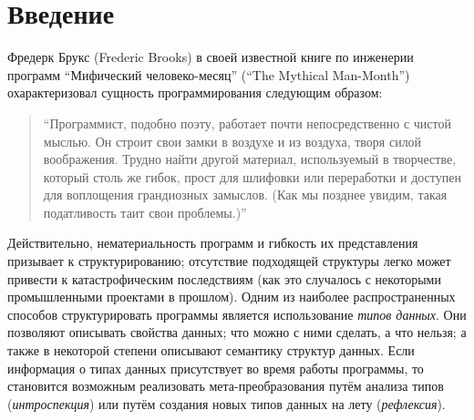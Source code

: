 \section{Введение}

Фредерк Брукс (Frederic Brooks) в своей известной книге по инженерии
программ  ``Мифический человеко-месяц'' (``The Mythical Man-Month'')~\cite{MMM} охарактеризовал сущность программирования следующим образом:

\blockquote{``Программист, подобно поэту, работает почти непосредственно с чистой мыслью. Он строит свои замки в воздухе и из воздуха, творя силой воображения. Трудно найти другой материал, используемый в творчестве, который столь же гибок, прост для шлифовки или переработки и доступен для воплощения грандиозных замыслов. (Как мы позднее увидим, такая податливость таит свои проблемы.)''}

Действительно, нематериальность программ и гибкость их представления  призывает к структурированию; отсутствие подходящей структуры легко может привести к катастрофическим последствиям
(как это случалось с некоторыми промышленными проектами в прошлом). Одним из наиболее распространенных способов структурировать программы является использование \emph{типов данных}. Они позволяют описывать свойства данных; что можно с ними сделать, а что нельзя; а также в некоторой степени описывают семантику структур данных. Если информация о типах данных присутствует во время работы программы, то становится возможным реализовать мета-преобразования путём анализа типов (\emph{интроспекция}) или путём создания новых типов данных на лету (\emph{рефлексия}).

